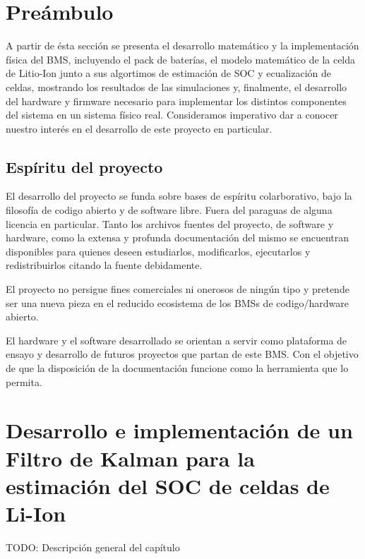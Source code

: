 \documentclass[10pt, a4paper]{report}
\begin{document}
\thispagestyle{fancy}



\chapter{Preámbulo}\label{preambulo}
\thispagestyle{fancy}

A partir de \'esta secci\'on se presenta el desarrollo matem\'atico y la implementaci\'on 
f\'isica del \acrshort{BMS}, incluyendo el pack de bater\'ias, el modelo 
matem\'atico de la celda de Litio-Ion junto a sus algortimos de estimaci\'on de 
\acrshort{SOC} y ecualizaci\'on de celdas, mostrando los resultados de las
simulaciones y, finalmente, el desarrollo del hardware y firmware necesario para
implementar los distintos componentes del sistema en un sistema f\'isico real. 
Consideramos imperativo dar a conocer nuestro interés en el desarrollo de este proyecto en particular.

\section{Espíritu del proyecto}

El desarrollo del proyecto se funda sobre bases de espíritu colarborativo, bajo
la filosofía de codigo abierto y de software libre. Fuera del paraguas de alguna
licencia en particular. Tanto los archivos fuentes del proyecto, de software y
hardware, como la extensa y profunda documentación del mismo se encuentran
disponibles para quienes deseen estudiarlos, modificarlos, ejecutarlos y
redistribuirlos citando la fuente debidamente. 

El proyecto no persigue fines comerciales ni onerosos de ningún tipo y pretende
ser una nueva pieza en el reducido ecosistema de los \acrshort{BMS}s de
codigo/hardware abierto.

El hardware y el software desarrollado se orientan a servir como plataforma de
ensayo y desarrollo de futuros proyectos que partan de este \acrshort{BMS}. Con
el objetivo de que la disposición de la documentación funcione como la
herramienta que lo permita.


\chapter{Desarrollo e implementación de un Filtro de Kalman para la estimación del \acrshort{SOC} de celdas de Li-Ion}\label{ch:dev_soc}
\thispagestyle{fancy}

TODO: Descripción general del capítulo
\end{document}
